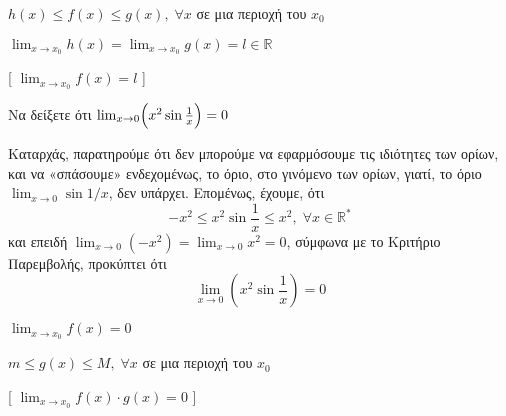 \begin{prop}
\item {}
  \begin{minipage}[t]{8.0 cm}
    \begin{myitemize}
      \item $ h(x) \leq f(x) \leq g(x), \; \forall x$ σε μια περιοχή του $ x_{0} $
        \hfill{}
      \item $ \lim_{x \to x_{0}} h(x) = \lim_{x \to x_{0}} g(x) = l \in \mathbb{R} $
        \hfill{}
    \end{myitemize}
  \end{minipage}
  [ $ \lim_{x \to x_{0}} f(x) = l $ ]
\end{prop}

\begin{example}
  Να δείξετε ότι $ \lim_{x \to 0} \Bigl(x^{2} \sin{\frac{1}{x}}\Bigr) = 0  $ 
\end{example}
\begin{solution}
Καταρχάς, παρατηρούμε ότι δεν μπορούμε να εφαρμόσουμε τις ιδιότητες των ορίων, και να 
«σπάσουμε» ενδεχομένως, το όριο, στο γινόμενο των ορίων, γιατί, το όριο 
$ \lim_{x \to 0} \sin{1/x} $, δεν υπάρχει.
  Επομένως, έχουμε, ότι
  \[
    - x^{2} \leq x^{2} \sin{\frac{1}{x}} \leq x^{2}, \; \forall x \in \mathbb{R}^{*}
  \]
  και επειδή $ \lim_{x \to 0} (-x^{2}) = \lim_{x \to 0} x^{2} = 0 $, σύμφωνα με το 
  Κριτήριο Παρεμβολής, προκύπτει ότι 
  \[
    \lim_{x \to 0} \left(x^{2} \sin{\frac{1}{x}}\right)  = 0
  \]
\end{solution}

\begin{prop}
\item {}
  \begin{minipage}[t]{7.5 cm}
    \begin{myitemize}
      \item $ \lim_{x \to x_{0}} f(x) = 0 $
        \hfill{}
      \item $ m \leq g(x) \leq M, \; \forall x $ σε μια περιοχή του $ x_{0} $
        \hfill{}
    \end{myitemize}
  \end{minipage}
  [ $ \lim_{x \to x_{0}} f(x) \cdot g(x) = 0 $ ]
\end{prop}




\newpage


